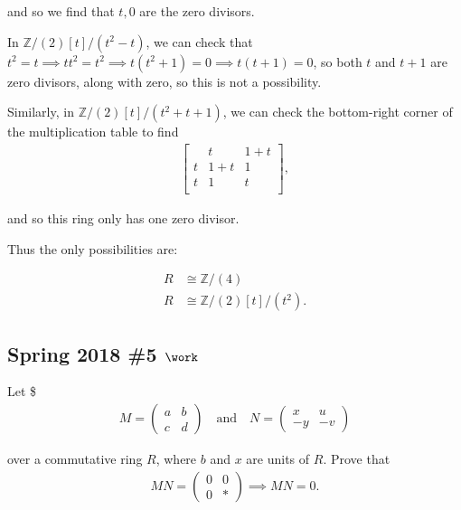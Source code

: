 \begin{solution}
and so we find that \(t, 0\) are the zero divisors.

In \({\mathbb{Z}}/(2)[t]/(t^2 - t)\), we can check that
\(t^2 = t \implies t t^2 = t^2 \implies t(t^2 + 1) = 0 \implies t(t+1) = 0\),
so both \(t\) and \(t+1\) are zero divisors, along with zero, so this is
not a possibility.

Similarly, in \({\mathbb{Z}}/(2)[t]/(t^2 + t + 1)\), we can check the
bottom-right corner of the multiplication table to find
\begin{align*}
\left[\begin{array}{c|cc}
    & t     & 1 +t \\ \hline
t & 1+t & 1 \\
t & 1   & t \\
\end{array}\right]
,\end{align*}

and so this ring only has one zero divisor.

Thus the only possibilities are:

\begin{align*}
R &\cong {\mathbb{Z}}/(4) \\
R &\cong {\mathbb{Z}}/(2)[t] / (t^2)
.\end{align*}

\end{solution}

\hypertarget{spring-2018-5-work}{%
\subsection{\texorpdfstring{Spring 2018 \#5
\(\work\)}{Spring 2018 \#5 \textbackslash work}}\label{spring-2018-5-work}}

Let \$
\begin{align*}
M=\left(\begin{array}{ll}{a} & {b} \\ {c} & {d}\end{array}\right)
\quad \text{and} \quad 
N=\left(\begin{array}{cc}{x} & {u} \\ {-y} & {-v}\end{array}\right)
\end{align*}

over a commutative ring \(R\), where \(b\) and \(x\) are units of \(R\).
Prove that
\begin{align*}
M N=\left(\begin{array}{ll}{0} & {0} \\ {0} & {*}\end{array}\right)
\implies MN = 0
.\end{align*}

